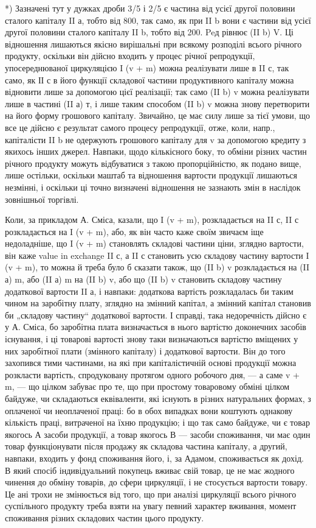 *) Зазначені тут у дужках дроби 3/5 і 2/5 є частина від усієї другої половини
сталого капіталу II а, тобто від 800, так само, як при II b вони є частини від усієї
другої половини сталого капіталу II b, тобто від 200. Peд
рівнює (II b) V. Ці відношення лишаються якісно вирішальні при всякому
розподілі всього річного продукту, оскільки він дійсно входить у процес
річної репродукції, упосереднюваної циркуляцією I (v + m) можна реалізувати
лише в II с, так само, як ІІ с в його функції складової частини
продуктивного капіталу можна відновити лише за допомогою цієї реалізації;
так само (II b) v можна реалізувати лише в частині (II а) т, і лише
таким способом (II b) v можна знову перетворити на його форму грошового
капіталу. Звичайно, це має силу лише за тієї умови, що все це дійсно
є результат самого процесу репродукції, отже, коли, напр., капіталісти
II b не одержують грошового капіталу для v за допомогою кредиту з
якихось інших джерел. Навпаки, щодо кількісного боку, то обміни різних
частин річного продукту можуть відбуватися з такою пропорційністю, як
подано вище, лише остільки, оскільки маштаб та відношення вартости
продукції лишаються незмінні, і оскільки ці точно визначені відношення
не зазнають змін в наслідок зовнішньої торгівлі.

Коли, за прикладом А. Сміса, казали, що I (v + m), розкладається на
II с, II с розкладається на I (v + m), або, як він часто каже своїм
звичаєм іще недоладніше, що I (v + m) становлять складові частини ціни,
зглядно вартости, він каже value in exchange II с, а II с становить усю
складову частину вартости I (v + m), то можна й треба було б сказати
також, що (II b) v розкладається на (II а) m, або (II а) m на (II b) v,
або що (II b) v становить складову частину додаткової вартости II а, і
навпаки: додаткова вартість розкладалась би таким чином на заробітну
плату, зглядно на змінний капітал, а змінний капітал становив би „складову
частину“ додаткової вартости. І справді, така недоречність дійсно
є у А. Сміса, бо заробітна плата визначається в нього вартістю доконечних
засобів існування, і ці товарові вартості знову таки визначаються
вартістю вміщених у них заробітної плати (змінного капіталу) і додаткової
вартости. Він до того захопився тими частинами, на які при капіталістичній
основі продукції можна розкласти вартість, спродуковану протягом
одного робочого дня, — а саме v + m, — що цілком забуває про те, що при
простому товаровому обміні цілком байдуже, чи складаються еквіваленти,
які існують в різних натуральних формах, з оплаченої чи неоплаченої праці:
бо в обох випадках вони коштують однакову кількість праці, витраченої
на їхню продукцію; і що так само байдуже, чи є товар якогось А засоби
продукції, а товар якогось В — засоби споживання, чи має один
товар функціонувати після продажу як складова частина капіталу, а
другий, навпаки, входить у фонд споживання його, і, за Адамом, споживається
як дохід. В який спосіб індивідуальний покупець вживає свій
товар, це не має жодного чинення до обміну товарів, до сфери циркуляції,
і не стосується вартости товару. Це ані трохи не змінюється
від того, що при аналізі циркуляції всього річного суспільного продукту
треба взяти на увагу певний характер вживання, момент споживання
різних складових частин цього продукту.

